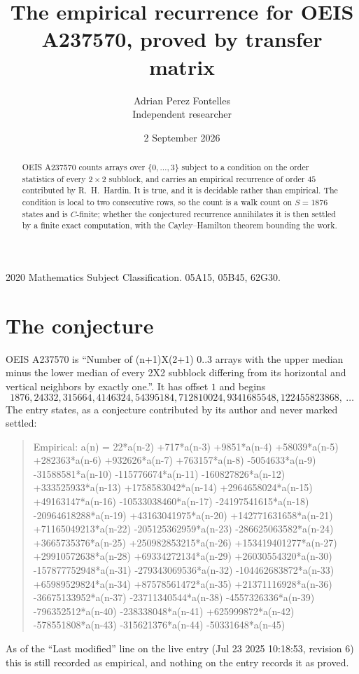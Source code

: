 \documentclass[11pt,a4paper]{article}
\title{The empirical recurrence for OEIS A237570, proved by transfer matrix}
\author{Adrian Perez Fontelles\\ \small Independent researcher}
\date{2 September 2026}
\theoremstyle{plain}
\theoremstyle{definition}
\begin{document}
\maketitle

\begin{abstract}
OEIS A237570 counts arrays over $\{0,\dots,3\}$ subject to a condition on the order
statistics of every $2\times2$ subblock, and carries an empirical recurrence of order
$45$ contributed by R.~H.~Hardin. It is true, and it is decidable rather than empirical.
The condition is local to two consecutive rows, so the count is a walk count on $S=1876$
states and is $C$-finite; whether the conjectured recurrence annihilates it is then settled by
a finite exact computation, with the Cayley--Hamilton theorem bounding the work.
\end{abstract}

\noindent\small 2020 Mathematics Subject Classification. 05A15, 05B45, 62G30.\normalsize

\section{The conjecture}

OEIS A237570 is ``Number of (n+1)X(2+1) 0..3 arrays with the upper median minus the lower median of every 2X2 subblock differing from its horizontal and vertical neighbors by exactly one.''. It has offset $1$ and begins
\[
1876, 24332, 315664, 4146324, 54395184, 712810024, 9341685548, 122455823868,\ \dots
\]
The entry states, as a conjecture contributed by its author and never marked settled:
\begin{quote}
Empirical: a(n) = 22*a(n-2) +717*a(n-3) +9851*a(n-4) +58039*a(n-5) +282363*a(n-6) +932626*a(n-7) +763157*a(n-8) -5054633*a(n-9) -31588581*a(n-10) -115776674*a(n-11) -160827826*a(n-12) +333525933*a(n-13) +1758583042*a(n-14) +2964658024*a(n-15) +49163147*a(n-16) -10533038460*a(n-17) -24197541615*a(n-18) -20964618288*a(n-19) +43163041975*a(n-20) +142771631658*a(n-21) +71165049213*a(n-22) -205125362959*a(n-23) -286625063582*a(n-24) +3665735376*a(n-25) +250982853215*a(n-26) +153419401277*a(n-27) +29910572638*a(n-28) +69334272134*a(n-29) +26030554320*a(n-30) -157877752948*a(n-31) -279343069536*a(n-32) -104462683872*a(n-33) +65989529824*a(n-34) +87578561472*a(n-35) +21371116928*a(n-36) -36675133952*a(n-37) -23711340544*a(n-38) -4557326336*a(n-39) -796352512*a(n-40) -238338048*a(n-41) +625999872*a(n-42) -578551808*a(n-43) -315621376*a(n-44) -50331648*a(n-45)
\end{quote}
As of the ``Last modified'' line on the live entry (Jul 23 2025 10:18:53, revision 6) this is still
recorded as empirical, and nothing on the entry records it as proved.
\end{document}
